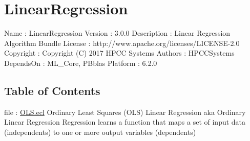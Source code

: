 \chapter*{LinearRegression}
\hypertarget{LinearRegression}{}

Name : LinearRegression
Version : 3.0.0
Description : Linear Regression Algorithm Bundle
License : http://www.apache.org/licenses/LICENSE-2.0
Copyright : Copyright (C) 2017 HPCC Systems
Authors : HPCCSystems
DependsOn : ML\_Core, PBblas
Platform : 6.2.0

\section*{Table of Contents}
file : \hyperlink{LinearRegression.OLS}{OLS.ecl}  Ordinary Least Squares (OLS) Linear Regression aka Ordinary Linear Regression Regression learns a function that maps a set of input data (independents) to one or more output variables (dependents) \\


